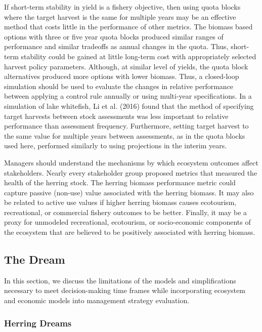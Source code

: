 \documentclass[]{article}
\begin{document}
If short-term stability in yield is a fishery objective, then using
quota blocks where the target harvest is the same for multiple years may
be an effective method that costs little in the performance of other
metrics. The biomass based options with three or five year quota blocks
produced similar ranges of performance and similar tradeoffs as annual
changes in the quota. Thus, short-term stability could be gained at
little long-term cost with appropriately selected harvest policy
parameters. Although, at similar level of yields, the quota block
alternatives produced more options with lower biomass. Thus, a
closed-loop simulation should be used to evaluate the changes in
relative performance between applying a control rule annually or using
multi-year specifications. In a simulation of lake whitefish, Li et al.
(2016) found that the method of specifying target harvests between stock
assessments was less important to relative performance than assessment
frequency. Furthermore, setting target harvest to the same value for
multiple years between assessments, as in the quota blocks used here,
performed similarly to using projections in the interim years.

Managers should understand the mechanisms by which ecosystem outcomes
affect stakeholders. Nearly every stakeholder group proposed metrics
that measured the health of the herring stock. The herring biomass
performance metric could capture passive (non-use) value associated with
the herring biomass. It may also be related to active use values if
higher herring biomass causes ecotourism, recreational, or commercial
fishery outcomes to be better. Finally, it may be a proxy for unmodeled
recreational, ecotourism, or socio-economic components of the ecosystem
that are believed to be positively associated with herring biomass.

\subsection{The Dream}\label{the-dream}

In this section, we discuss the limitations of the models and
simplifications necessary to meet decision-making time frames while
incorporating ecosystem and economic models into management strategy
evaluation.

\subsubsection{Herring Dreams}\label{herring-dreams}
\end{document}
